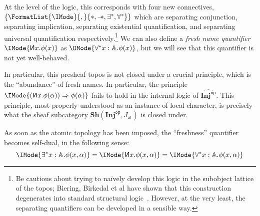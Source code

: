 \documentclass{article}
\newcommand\OpCat[1]{{{#1}^{\mathsf{op}}}}
\newcommand\Psh[1]{\widehat{#1}}
\newcommand\Sh[1]{\mathbf{Sh} (#1)}
\newcommand\JAtomic{J_{\mathsf{at}}}
\newcommand\INJ{\mathbf{Inj}}
\newcommand\magicwand{\mathrel{-\mkern-6mu*}}
\newcommand\newname{\reflectbox{\ensuremath{\mathsf{N}}}}
\newcommand\MkSet[1]{\{#1\}}
\begin{document}
At the level of the logic, this corresponds with four new connectives,
$\MkSet{\FormatList{\IMode}{,}{*,\magicwand,\exists^*,\forall^*}}$
which are separating conjunction, separating implication, separating
existential quantification, and separating universal quantification
respectively.\footnote{Be cautious about trying to na\"ively develop
  this logic in the subobject lattice of the topos; Biering, Birkedal
  et al have shown that this construction degenerates into standard
  structural logic~\cite{biering-birkedal-torp-smith:2007}. However,
  at the very least, the separating quantifiers can be developed in a
  sensible way.}  We can also define a \emph{fresh name quantifier}
$\IMode{\newname x.\phi(x)}$ as
$\OMode{\forall^*x:\mathbb{A}.\phi(x)}$, but we will see that this
quantifier is not yet well-behaved.

In particular, this presheaf topos is not closed under a crucial
principle, which is the ``abundance'' of fresh names. In particular,
the principle $\IMode{(\newname x.\phi(\alpha))\Rightarrow\phi(\alpha)}$
fails to hold in the internal logic of $\Psh{\OpCat{\INJ}}$. This
principle, most properly understood as an instance of local character,
is precisely what the sheaf subcategory $\Sh{\OpCat{\INJ},\JAtomic}$
is closed under.

As soon as the atomic topology has been imposed, the ``freshness''
quantifier becomes self-dual, in the following sense:
\[
  \IMode{\exists^*x:\mathbb{A}.\phi(x,\alpha)}
  =
  \IMode{\newname x.\phi(x,\alpha)}
  =
  \IMode{\forall^*x:\mathbb{A}.\phi(x,\alpha)}
\]
\end{document}
